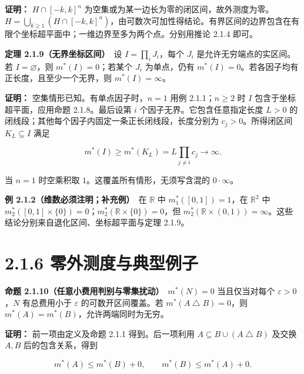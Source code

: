\documentclass[11pt,a4paper]{article}
\begin{document}
\textbf{证明：} \(H\cap[-k,k]^n\)
为空集或为某一边长为零的闭区间，故外测度为零。\(H=\bigcup_{k\ge1}(H\cap[-k,k]^n)\)，由可数次可加性得结论。有界区间的边界包含在有限个坐标超平面中；一维边界至多为两个点。分别用推论
2.1.4 即可。

\textbf{定理 2.1.9（无界坐标区间）}　设 \(I=\prod_iJ_i\)，每个 \(J_i\)
是允许无穷端点的实区间。若 \(I=\varnothing\)，则 \(m^*(I)=0\)；若某个
\(J_i\) 为单点，仍有
\(m^*(I)=0\)。若各因子均有正长度，且至少一个无界，则 \(m^*(I)=\infty\)。

\textbf{证明：} 空集情形已知。有单点因子时，\(n=1\) 用例
2.1.1；\(n\ge2\) 时 \(I\) 包含于坐标超平面，应用命题 2.1.8。最后设第
\(i\) 个因子无界。它包含任意指定长度 \(L>0\)
的闭线段；其他每个因子内固定一条正长闭线段，长度分别为
\(c_j>0\)。所得闭区间 \(K_L\subseteq I\) 满足

\begin{equation*}
m^*(I)\ge m^*(K_L)=L\prod_{j\ne i}c_j\longrightarrow\infty.
\tag{2.1.14}
\end{equation*}

当 \(n=1\) 时空乘积取 \(1\)。这覆盖所有情形，无须写含混的
\(0\cdot\infty\)。

\textbf{例 2.1.2（维数必须注明；补充例）}　在 \(\mathbb R\) 中
\(m_1^*([0,1])=1\)，在 \(\mathbb R^2\) 中
\(m_2^*([0,1]\times\{0\})=0\)；\(m_2^*(\mathbb R\times\{0\})=0\)，但
\(m_2^*(\mathbb R\times(0,1))=\infty\)。这些结论分别来自退化区间、坐标超平面与定理
2.1.9。

\section[\S{}2.1.6
零外测度与典型例子]{2.1.6
零外测度与典型例子}\label{ux96f6ux5916ux6d4bux5ea6ux4e0eux5178ux578bux4f8bux5b50}

\textbf{命题 2.1.10（任意小费用判别与零集扰动）}　\(m^*(N)=0\)
当且仅当对每个 \(\varepsilon>0\)，\(N\) 有总费用小于 \(\varepsilon\)
的可数开区间覆盖。若 \(m^*(A\mathbin{\triangle}B)=0\)，则
\(m^*(A)=m^*(B)\)，允许两端同时为无穷。

\textbf{证明：} 前一项由定义及命题 2.1.1 得到。后一项利用
\(A\subseteq B\cup(A\mathbin{\triangle}B)\) 及交换 \(A,B\)
后的包含关系，得到

\begin{equation*}
m^*(A)\le m^*(B)+0,\qquad m^*(B)\le m^*(A)+0.
\tag{2.1.15}
\end{equation*}
\end{document}
